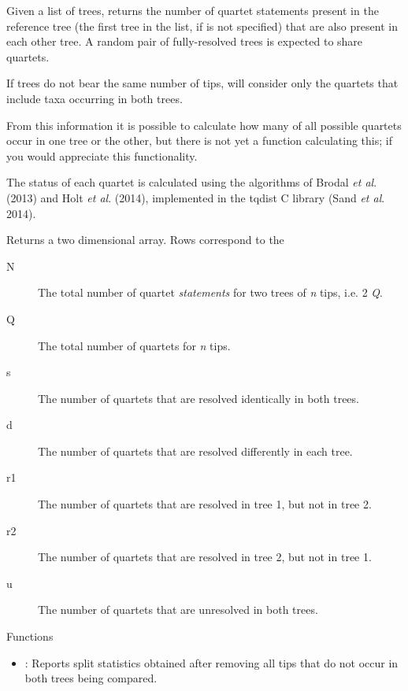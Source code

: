 \documentclass[a4paper]{book}
\begin{document}
%
\begin{Details}\relax
Given a list of trees, returns the number of quartet statements present in the
reference tree (the first tree in the list, if  is not specified)
that are also present in each other tree.  A random pair of fully-resolved
trees is expected to share  quartets.

If trees do not bear the same number of tips,  will
consider only the quartets that include taxa occurring in both trees.

From this information it is possible to calculate how many of all possible
quartets occur in one tree or the other, but there is not yet a function
calculating this; 
if you would appreciate this functionality.

The status of each quartet is calculated using the algorithms of
Brodal \emph{et al}. (2013) and Holt \emph{et al}. (2014), implemented in the
tqdist C library (Sand \emph{et al}. 2014).
\end{Details}
%
\begin{Value}
Returns a two dimensional array. Rows correspond to the
\begin{description}

\item[N] The total number of quartet \emph{statements} for two trees of \emph{n} tips,
i.e. 2 \emph{Q}.
\item[Q] The total number of quartets for \emph{n} tips.
\item[s] The number of quartets that are resolved identically in both trees.
\item[d] The number of quartets that are resolved differently in each tree.
\item[r1] The number of quartets that are resolved in tree 1, but not in tree 2.
\item[r2] The number of quartets that are resolved in tree 2, but not in tree 1.
\item[u] The number of quartets that are unresolved in both trees.

\end{description}

\end{Value}
%
\begin{Section}{Functions}
\begin{itemize}

\item {}: Reports split statistics obtained after removing all
tips that do not occur in both trees being compared.

\end{itemize}
\end{Section}
\end{document}
